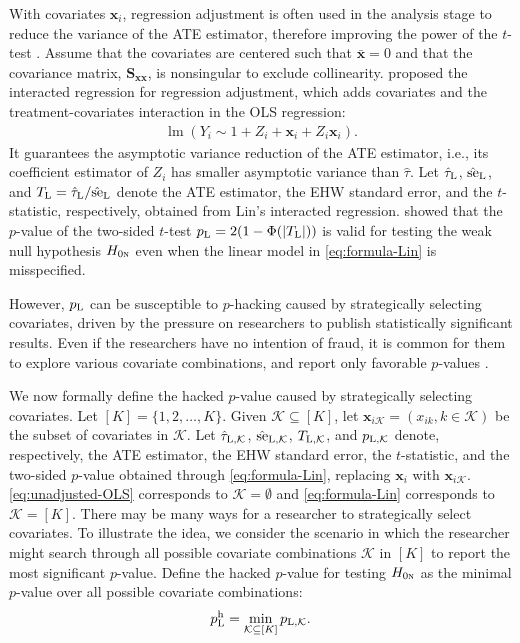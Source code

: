 \documentclass[12pt]{article}
\newcommand{\se}{\textnormal{se}}
\newcommand{\lmm}{\operatorname{lm}}
\newcommand{\Lin}{\textnormal{L}}
\newcommand{\mk}{\mathcal{K}}
\newcommand{\bs}{\boldsymbol}
\newcommand{\hpL}{p_\textnormal{L}^{\textnormal{h}}}
\begin{document}
With covariates $\bs{x}_i$, regression adjustment is often used in the analysis stage to reduce the variance of the ATE estimator, therefore improving the power of the $t$-test \citep{fisher1935design,freedman2008regression,Lin2013Agnostic}. 
Assume that the covariates are centered such that $\bar{\bs{x}} = 0$ and that the covariance matrix, $\bs{S}_{\bs{x}\bs{x}}$, is nonsingular to exclude collinearity. \citet{Lin2013Agnostic} proposed the interacted regression for regression adjustment, which adds covariates and the treatment-covariates interaction in the OLS regression:
\begin{align}
\label{eq:formula-Lin}
  \lmm(  Y_i \sim 1 + Z_i +\bs{x}_i + Z_i\bs{x}_i).
\end{align}
 It guarantees the asymptotic variance reduction of the ATE estimator, i.e., its coefficient estimator of $Z_i$ has smaller asymptotic variance than $\hat{\tau}$. Let $\hat{\tau}_{\Lin}$, $\hat{\se}_{\Lin}$, and $T_{\Lin}=\hat{\tau}_{\Lin}/\hat{\se}_{\Lin}$ denote the ATE estimator, the EHW standard error, and the $t$-statistic, respectively, obtained from Lin's interacted regression. \citet{Lin2013Agnostic} showed that the $p$-value of the two-sided $t$-test $p_{\Lin} =  2(1-\Phi(|T_{\Lin}|))$ is valid 
for testing the weak null hypothesis $H_{0\textsc{n}}$ even when the linear model in \eqref{eq:formula-Lin} is misspecified.

However, $p_{\Lin}$ can be susceptible to $p$-hacking caused by strategically selecting covariates, driven by the pressure on researchers to publish statistically significant results. Even if the researchers have no intention of fraud, it is common for them to explore various covariate combinations, and report only favorable $p$-values \citep{simmons2011false}. 

We now formally define the hacked $p$-value caused by strategically selecting covariates. Let $[K] = \{1,2,\ldots,K\}$. Given $\mk\subseteq [K]$, let $\bs{x}_{i\mk} = ({x}_{ik},k\in \mk)$ be the subset of covariates in $\mk$. Let $\hat{\tau}_{\Lin,\mk}$, $\hat{\se}_{\Lin,\mk}$, $T_{\Lin,\mk}$, and $p_{\Lin,\mk}$ denote, respectively, the ATE estimator, the EHW standard error, the $t$-statistic, and the two-sided $p$-value obtained through \eqref{eq:formula-Lin}, replacing $\bs{x}_i$ with $\bs{x}_{i\mk}$.  \eqref{eq:unadjusted-OLS} corresponds to $\mk = \emptyset$ and \eqref{eq:formula-Lin} corresponds to $\mk = [K]$.
There may be many ways for a researcher to strategically select covariates. To illustrate the idea, we consider the scenario in which the researcher might search through all possible 
covariate combinations $\mk$ in $[K]$ to report the most significant $p$-value.  Define the hacked $p$-value for testing $H_{0\textsc{n}}$ as the minimal $p$-value over all possible covariate combinations:
      \[
  \hpL = \min_{\mk\subseteq [K]} p_{\Lin,\mk}.
    \]
\end{document}
